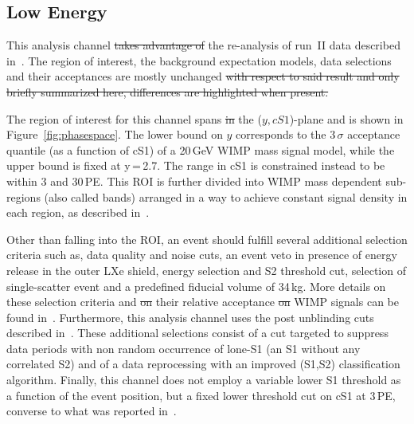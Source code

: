 
\subsection{Low Energy}
\label{subsec:LowE}
This analysis channel \sout{takes advantage of}  the re-analysis of run~II data described in~\cite{xe100_run_combination}. The region of interest, the background 
expectation models, data selections and their acceptances are mostly unchanged  \sout{with respect to said result and only briefly summarized here, 
differences are highlighted when present.} 

The region of interest for this channel spans \sout{in} the ($y,cS1$)-plane and is shown in Figure~\ref{fig:phasespace}.  The lower 
bound on $y$ corresponds to the 3\,$\sigma$ acceptance quantile (as a function of cS1) of a 20\,GeV WIMP mass signal model, while the upper bound is fixed at y\,=\,2.7.
The range in cS1 is constrained instead to be within 3 and 30\,PE. This  ROI is further divided into WIMP mass dependent sub-regions (also called bands) arranged in a way 
to achieve constant signal density in each region, as described in~\cite{xe100_run_combination}.

Other than falling into the ROI, an event should fulfill several additional selection criteria such as, data quality and noise cuts,
an event veto in presence of energy release in the outer LXe shield, energy selection and S2 threshold cut,
selection of single-scatter event and a predefined fiducial volume of 34\,kg. More details on these selection criteria and \sout{on} their 
relative acceptance \sout{on}  WIMP signals can be found in~\cite{Aprile:2012vw,xe100_run_combination}. 
Furthermore, this analysis channel uses the post unblinding cuts described in~\cite{xe100_run_combination}. 
These additional selections consist of a cut targeted to suppress data periods with non random occurrence of lone-S1 (an S1 without 
any correlated S2) and of a data reprocessing with an improved (S1,S2) classification algorithm.
Finally, this channel does not employ a variable lower S1 threshold as a function of the event position, but a fixed 
lower threshold cut on cS1 at 3\,PE, converse to what was reported in~\cite{xe100_run_combination}.

